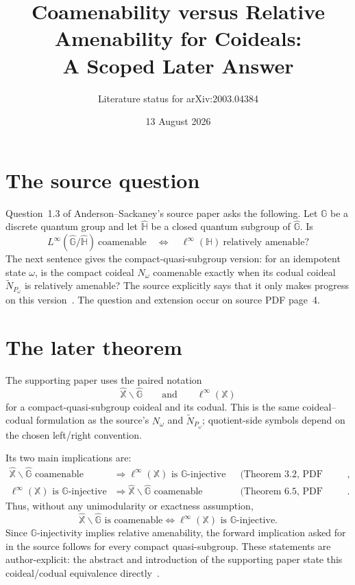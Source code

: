 \documentclass[11pt]{article}
\title{Coamenability versus Relative Amenability for Coideals:\\
A Scoped Later Answer}
\author{Literature status for arXiv:2003.04384}
\date{13 August 2026}
\newcommand{\G}{\mathbb G}
\newcommand{\X}{\mathbb X}
\newcommand{\wideG}{\widehat{\mathbb G}}
\newcommand{\wideX}{\widehat{\mathbb X}}
\begin{document}
\maketitle

\begin{center}
\end{center}

\section*{The source question}

Question~1.3 of Anderson--Sackaney's source paper asks the following.  Let
$\G$ be a discrete quantum group and let $\widehat{\mathbb H}$ be a closed
quantum subgroup of $\wideG$.  Is
\[
 L^\infty(\wideG/\widehat{\mathbb H})\ \text{coamenable}
 \quad\Longleftrightarrow\quad
 \ell^\infty(\mathbb H)\ \text{relatively amenable}?
\]
The next sentence gives the compact-quasi-subgroup version: for an idempotent
state $\omega$, is the compact coideal $N_\omega$ coamenable exactly when its
codual coideal $\widetilde N_{P_\omega}$ is relatively amenable?  The source
explicitly says that it only makes progress on this version~\cite{source}.
The question and extension occur on source PDF page~4.

\section*{The later theorem}

The supporting paper uses the paired notation
\[
 \wideX\backslash\wideG
 \qquad\text{and}\qquad
 \ell^\infty(\X)
\]
for a compact-quasi-subgroup coideal and its codual.  This is the same
coideal--codual formulation as the source's $N_\omega$ and
$\widetilde N_{P_\omega}$; quotient-side symbols depend on the chosen
left/right convention.

Its two main implications are:
\begin{align*}
 \wideX\backslash\wideG\text{ coamenable}
 &\Longrightarrow \ell^\infty(\X)\text{ is $\G$-injective}
 &&\text{(Theorem~3.2, PDF page~12)},\\
 \ell^\infty(\X)\text{ is $\G$-injective}
 &\Longrightarrow \wideX\backslash\wideG\text{ coamenable}
 &&\text{(Theorem~6.5, PDF page~25)}.
\end{align*}
Thus, without any unimodularity or exactness assumption,
\[
 \boxed{
 \wideX\backslash\wideG\text{ is coamenable}
 \iff
 \ell^\infty(\X)\text{ is $\G$-injective}.}
\]
Since $\G$-injectivity implies relative amenability, the forward implication
asked for in the source follows for every compact quasi-subgroup.  These
statements are author-explicit: the abstract and introduction of the
supporting paper state this coideal/codual equivalence directly~\cite{answer}.
\end{document}
